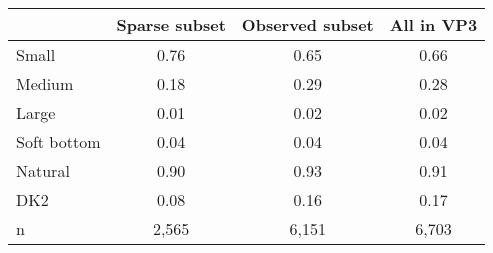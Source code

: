 \begin{tabular}{lccc}
\toprule
 & Sparse subset & Observed subset & All in VP3 \\
\midrule
Small & 0.76 & 0.65 & 0.66 \\
Medium & 0.18 & 0.29 & 0.28 \\
Large & 0.01 & 0.02 & 0.02 \\
Soft bottom & 0.04 & 0.04 & 0.04 \\
Natural & 0.90 & 0.93 & 0.91 \\
DK2 & 0.08 & 0.16 & 0.17 \\
n & 2,565 & 6,151 & 6,703 \\
\bottomrule
\end{tabular}

